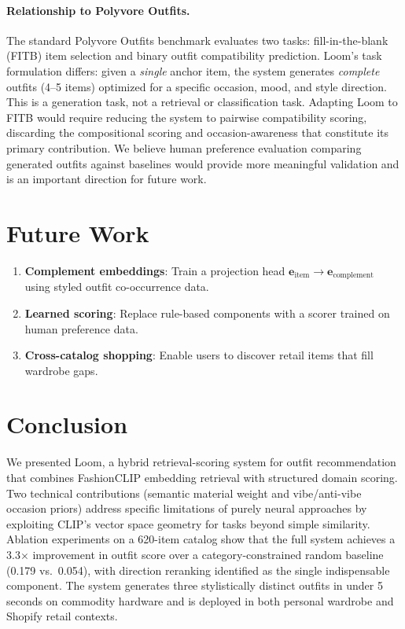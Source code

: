 \documentclass[10pt,twocolumn]{article}
\begin{document}
\paragraph{Relationship to Polyvore Outfits.}
The standard Polyvore Outfits benchmark \citep{vasileva2018learning}
evaluates two tasks: fill-in-the-blank (FITB) item selection and binary
outfit compatibility prediction.  Loom's task formulation differs: given a
\emph{single} anchor item, the system generates \emph{complete} outfits
(4--5 items) optimized for a specific occasion, mood, and style direction.
This is a generation task, not a retrieval or classification task.
Adapting Loom to FITB would require reducing the system to pairwise
compatibility scoring, discarding the compositional scoring and
occasion-awareness that constitute its primary contribution.  We believe
human preference evaluation comparing generated outfits against baselines
would provide more meaningful validation and is an important direction for
future work.

\section{Future Work}
\label{sec:future}

\begin{enumerate}[leftmargin=*,topsep=2pt,itemsep=1pt]
\item \textbf{Complement embeddings}: Train a projection head
  $\mathbf{e}_{\text{item}} \to \mathbf{e}_{\text{complement}}$ using
  styled outfit co-occurrence data.
\item \textbf{Learned scoring}: Replace rule-based components with a scorer
  trained on human preference data.
\item \textbf{Cross-catalog shopping}: Enable users to discover retail items
  that fill wardrobe gaps.
\end{enumerate}

\section{Conclusion}

We presented Loom, a hybrid retrieval-scoring system for outfit
recommendation that combines FashionCLIP embedding retrieval with structured
domain scoring.  Two technical contributions (semantic material weight
and vibe/anti-vibe occasion priors) address
specific limitations of purely neural approaches by exploiting CLIP's vector
space geometry for tasks beyond simple similarity.  Ablation experiments
on a 620-item catalog show that the full system achieves a 3.3$\times$
improvement in outfit score over a category-constrained random baseline
(0.179 vs.\ 0.054), with direction reranking identified as the single
indispensable component.  The system generates three stylistically distinct
outfits in under 5 seconds on
commodity hardware and is deployed in both personal wardrobe and Shopify
retail contexts.
\end{document}

